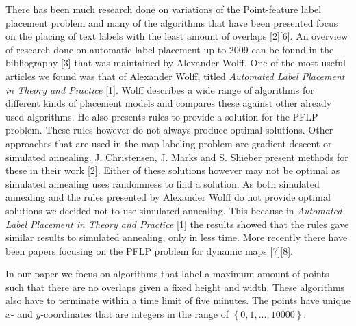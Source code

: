 \documentclass[crop=false,a4paper,oneside,11pt]{standalone}
\begin{document}
 There has been much research done on variations of the Point-feature label placement problem and many of the algorithms that have been presented focus on the placing of text labels with the least amount of overlaps [2][6]. An overview of research done on automatic label placement up to 2009 can be found in the bibliography [3] that was maintained by Alexander Wolff. One of the most useful articles we found was that of Alexander Wolff, titled \emph{Automated Label Placement in Theory and Practice} [1]. Wolff describes a wide range of algorithms for different kinds of placement models and compares these against other already used algorithms. He also presents rules to provide a solution for the PFLP problem. These rules however do not always produce optimal solutions. Other approaches that are used in the map-labeling problem are gradient descent or simulated annealing. J. Christensen, J. Marks and S. Shieber present methods for these in their work [2]. Either of these solutions however may not be optimal as simulated annealing uses randomness to find a solution. As both simulated annealing and the rules presented by Alexander Wolff do not provide optimal solutions we decided not to use simulated annealing. This because in \emph{Automated Label Placement in Theory and Practice} [1] the results showed that the rules gave similar results to simulated annealing, only in less time.  More recently there have been papers focusing on the PFLP problem for dynamic maps [7][8].

 In our paper we focus on algorithms that label a maximum amount of points such that there are no overlaps given a fixed height and width. These algorithms also have to terminate within a time limit of five minutes. The points have unique $x$- and $y$-coordinates that are integers in the range of $\left\{0,1,...,10000\right\}$.
\end{document}
